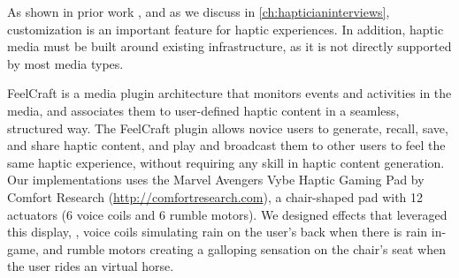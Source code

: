As shown in prior work \cite{Seifi2013,Seifi2014}, and as we discuss in \autoref{ch:hapticianinterviews}, customization is an important feature for haptic experiences.
In addition, haptic media must be built around existing infrastructure, as it is not directly supported by most media types.


FeelCraft is a media plugin architecture that monitors events and activities in the media, and associates them to user-defined haptic content in a seamless, structured way.
The FeelCraft plugin allows novice users to generate, recall, save, and share haptic content, and play and broadcast them to other users to feel the same haptic experience, without requiring any skill in haptic content generation.
Our implementations uses the Marvel Avengers Vybe Haptic Gaming Pad by Comfort Research (\url{http://comfortresearch.com}), a chair-shaped pad with 12 actuators (6 voice coils and 6 rumble motors).
We designed effects that leveraged this display, \eg, voice coils simulating rain on the user's back when there is rain in-game, and rumble motors creating a galloping sensation on the chair's seat when the user rides an virtual horse.



